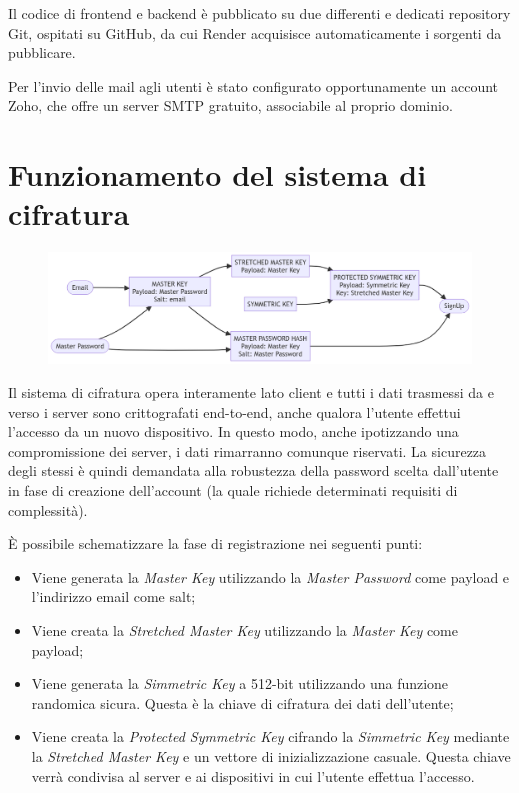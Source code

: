 \documentclass[a4paper]{report}
\begin{document}
Il codice di frontend e backend è pubblicato su due differenti e dedicati repository Git\cite{git}, ospitati su GitHub\cite{github}, da cui Render acquisisce automaticamente i sorgenti da pubblicare.

Per l'invio delle mail agli utenti è stato configurato opportunamente un account Zoho\cite{zoho}, che offre un server SMTP gratuito, associabile al proprio dominio.

\section{Funzionamento del sistema di cifratura}
    \begin{figure}[H]
        \centering
        \includegraphics[width=1.0\textwidth]{figures/infoEncription}
    \end{figure}
Il sistema di cifratura opera interamente lato client e tutti i dati trasmessi da e verso i server sono crittografati end-to-end, anche qualora l'utente effettui l'accesso da un nuovo dispositivo. In questo modo, anche ipotizzando una compromissione dei server, i dati rimarranno comunque riservati. La sicurezza degli stessi è quindi demandata alla robustezza della password scelta dall'utente in fase di creazione dell'account (la quale richiede determinati requisiti di complessità).

È possibile schematizzare la fase di registrazione nei seguenti punti:
\begin{itemize}
    \item Viene generata la \textit{Master Key} utilizzando la \textit{Master Password} come payload e l'indirizzo email come salt;
    \item Viene creata la \textit{Stretched Master Key} utilizzando la \textit{Master Key} come payload;
    \item Viene generata la \textit{Simmetric Key} a 512-bit utilizzando una funzione randomica sicura. Questa è la chiave di cifratura dei dati dell'utente;
    \item Viene creata la \textit{Protected Symmetric Key} cifrando la \textit{Simmetric Key} mediante la \textit{Stretched Master Key} e un vettore di inizializzazione casuale. Questa chiave verrà condivisa al server e ai dispositivi in cui l'utente effettua l'accesso.
\end{itemize}
\end{document}
